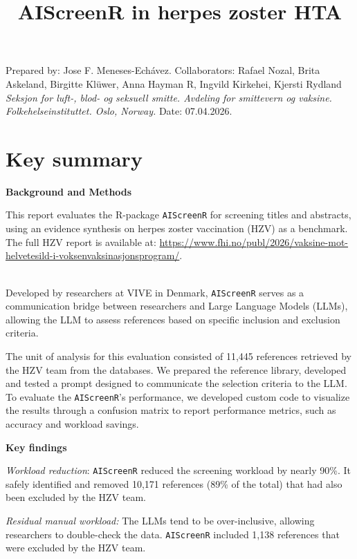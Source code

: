 \documentclass[
  letterpaper,
  DIV=11,
  numbers=noendperiod]{scrartcl}
\title{AIScreenR in herpes zoster HTA}
\author{}
\date{}
\renewcommand*\contentsname{Table of contents}
\newcommand\contentsname{Table of contents}
\begin{document}
\maketitle

\renewcommand*\contentsname{Table of contents}
{
\setcounter{tocdepth}{3}
\tableofcontents
}

Prepared by: Jose F. Meneses-Echávez. Collaborators: Rafael Nozal, Brita
Askeland, Birgitte Klüwer, Anna Hayman R, Ingvild Kirkehei, Kjersti
Rydland \emph{Seksjon for luft-, blod- og seksuell smitte. Avdeling for
smittevern og vaksine. Folkehelseinstituttet. Oslo, Norway.} Date:
07.04.2026.

\section{Key summary}\label{key-summary}

\textbf{Background and Methods}

This report evaluates the R-package \texttt{AIScreenR} for screening
titles and abstracts, using an evidence synthesis on herpes zoster
vaccination (HZV) as a benchmark. The full HZV report is available at:
\url{https://www.fhi.no/publ/2026/vaksine-mot-helvetesild-i-voksenvaksinasjonsprogram/}.\\
\strut \\
Developed by researchers at VIVE in Denmark, \texttt{AIScreenR} serves
as a communication bridge between researchers and Large Language Models
(LLMs), allowing the LLM to assess references based on specific
inclusion and exclusion criteria.

The unit of analysis for this evaluation consisted of 11,445 references
retrieved by the HZV team from the databases. We prepared the reference
library, developed and tested a prompt designed to communicate the
selection criteria to the LLM. To evaluate the \texttt{AIScreenR}'s
performance, we developed custom code to visualize the results through a
confusion matrix to report performance metrics, such as accuracy and
workload savings.

\textbf{Key findings}

\emph{Workload reduction}: \texttt{AIScreenR} reduced the screening
workload by nearly 90\%. It safely identified and removed 10,171
references (89\% of the total) that had also been excluded by the HZV
team.

\emph{Residual manual workload:} The LLMs tend to be over-inclusive,
allowing researchers to double-check the data. \texttt{AIScreenR}
included 1,138 references that were excluded by the HZV team.
\end{document}
